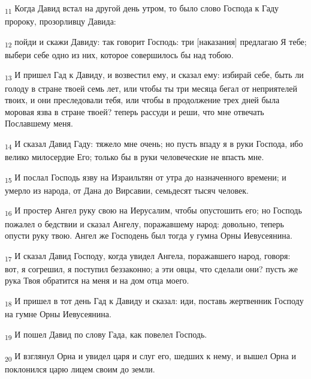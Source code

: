 \begin{tcolorbox}
\textsubscript{11} Когда Давид встал на другой день утром, то было слово Господа к Гаду пророку, прозорливцу Давида:
\end{tcolorbox}
\begin{tcolorbox}
\textsubscript{12} пойди и скажи Давиду: так говорит Господь: три [наказания] предлагаю Я тебе; выбери себе одно из них, которое совершилось бы над тобою.
\end{tcolorbox}
\begin{tcolorbox}
\textsubscript{13} И пришел Гад к Давиду, и возвестил ему, и сказал ему: избирай себе, быть ли голоду в стране твоей семь лет, или чтобы ты три месяца бегал от неприятелей твоих, и они преследовали тебя, или чтобы в продолжение трех дней была моровая язва в стране твоей? теперь рассуди и реши, что мне отвечать Пославшему меня.
\end{tcolorbox}
\begin{tcolorbox}
\textsubscript{14} И сказал Давид Гаду: тяжело мне очень; но пусть впаду я в руки Господа, ибо велико милосердие Его; только бы в руки человеческие не впасть мне.
\end{tcolorbox}
\begin{tcolorbox}
\textsubscript{15} И послал Господь язву на Израильтян от утра до назначенного времени; и умерло из народа, от Дана до Вирсавии, семьдесят тысяч человек.
\end{tcolorbox}
\begin{tcolorbox}
\textsubscript{16} И простер Ангел руку свою на Иерусалим, чтобы опустошить его; но Господь пожалел о бедствии и сказал Ангелу, поражавшему народ: довольно, теперь опусти руку твою. Ангел же Господень был тогда у гумна Орны Иевусеянина.
\end{tcolorbox}
\begin{tcolorbox}
\textsubscript{17} И сказал Давид Господу, когда увидел Ангела, поражавшего народ, говоря: вот, я согрешил, я поступил беззаконно; а эти овцы, что сделали они? пусть же рука Твоя обратится на меня и на дом отца моего.
\end{tcolorbox}
\begin{tcolorbox}
\textsubscript{18} И пришел в тот день Гад к Давиду и сказал: иди, поставь жертвенник Господу на гумне Орны Иевусеянина.
\end{tcolorbox}
\begin{tcolorbox}
\textsubscript{19} И пошел Давид по слову Гада, как повелел Господь.
\end{tcolorbox}
\begin{tcolorbox}
\textsubscript{20} И взглянул Орна и увидел царя и слуг его, шедших к нему, и вышел Орна и поклонился царю лицем своим до земли.
\end{tcolorbox}
